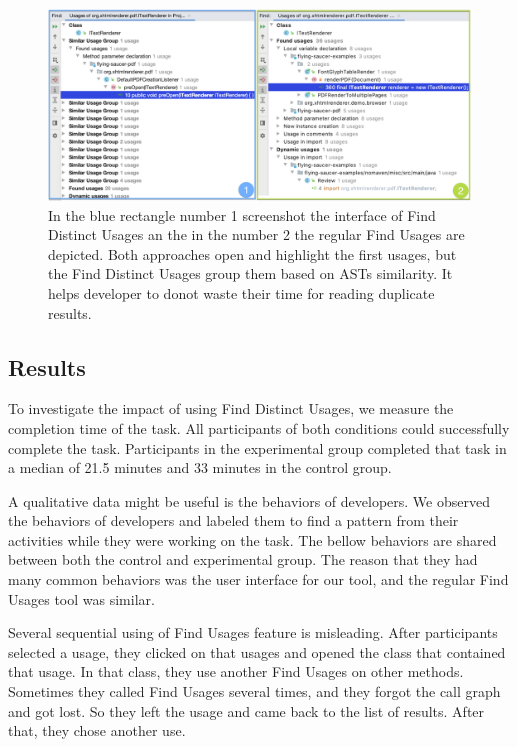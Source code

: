 \documentclass[conference]{IEEEtran}
\begin{document}
\begin{figure}[h]
    \centering
    \includegraphics [width=\textwidth,keepaspectratio,clip]{figures/compare}
    \caption{In the blue rectangle number 1 screenshot the interface of Find Distinct Usages an the in the number 2 the regular Find Usages are depicted. Both approaches open and highlight the first usages, but the Find Distinct Usages group them based on ASTs similarity. It helps developer to donot waste their time for reading duplicate results.  }
\label{fig:compare}
\end{figure}

\subsection{Results}
To investigate the impact of using Find Distinct Usages, we measure the completion time of the task. All participants of both conditions could successfully complete the task. Participants in the experimental group completed that task in a median of 21.5 minutes and 33 minutes in the control group. \par

A qualitative data might be useful is the behaviors of developers. We observed the behaviors of developers and labeled them to find a pattern from their activities while they were working on the task. The bellow behaviors are shared between both the control and experimental group. The reason that they had many common behaviors was the user interface for our tool, and the regular Find Usages tool was similar. \par

Several sequential using of Find Usages feature is misleading. After participants selected a usage, they clicked on that usages and opened the class that contained that usage. In that class, they use another Find Usages on other methods. Sometimes they called Find Usages several times, and they forgot the call graph and got lost. So they left the usage and came back to the list of results. After that, they chose another use. \par
\end{document}
